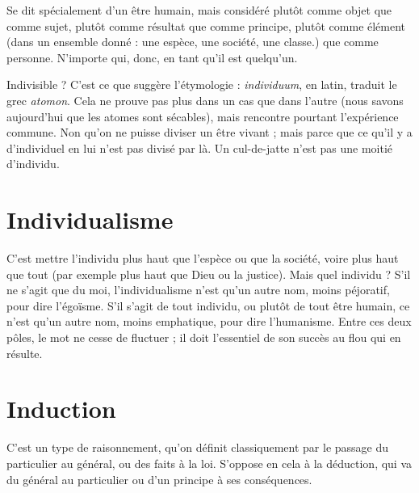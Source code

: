 Se dit spécialement d’un être humain, mais considéré plutôt comme objet
que comme sujet, plutôt comme résultat que comme principe, plutôt comme
élément (dans un ensemble donné : une espèce, une société, une classe.) que
comme personne. N'importe qui, donc, en tant qu’il est quelqu'un.

Indivisible ? C’est ce que suggère l’étymologie : {\it individuum}, en latin, traduit
le grec {\it atomon}. Cela ne prouve pas plus dans un cas que dans l’autre (nous
savons aujourd’hui que les atomes sont sécables), mais rencontre pourtant
l'expérience commune. Non qu’on ne puisse diviser un être vivant ; mais parce
que ce qu’il y a d’individuel en lui n’est pas divisé par là. Un cul-de-jatte n’est
pas une moitié d’individu.

\section{Individualisme}
C’est mettre l'individu plus haut que l’espèce ou que la
société, voire plus haut que tout (par exemple plus
haut que Dieu ou la justice). Mais quel individu ? S'il ne s’agit que du moi,
l’individualisme n’est qu’un autre nom, moins péjoratif, pour dire l’égoïsme.
S’il s’agit de tout individu, ou plutôt de tout être humain, ce n’est qu’un autre
nom, moins emphatique, pour dire l’humanisme. Entre ces deux pôles, le mot
ne cesse de fluctuer ; il doit l'essentiel de son succès au flou qui en résulte.

\section{Induction}
C'est un type de raisonnement, qu’on définit classiquement
par le passage du particulier au général, ou des faits à la loi.
S’oppose en cela à la déduction, qui va du général au particulier ou d’un principe
à ses conséquences.


